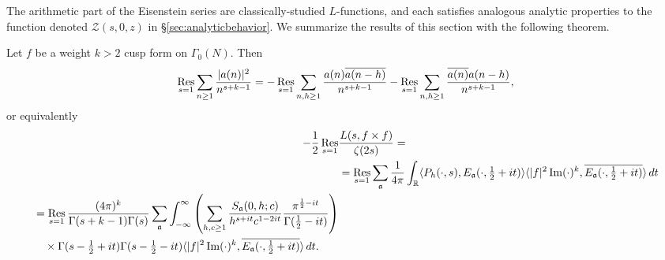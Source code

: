 The arithmetic part of the Eisenstein series are classically-studied $L$-functions, and
each satisfies analogous analytic properties to the function denoted $\mathcal{Z}(s,0,z)$
in \S\ref{sec:analyticbehavior}.
We summarize the results of this section with the following theorem.


\begin{theorem}\label{thm:general_weight_level_comparison}
  Let $f$ be a weight $k > 2$ cusp form on $\Gamma_0(N)$. Then
  \begin{align}\label{eq:general_level_general_comparison}
    \operatorname*{Res}_{s = 1} \sum_{n \geq 1} \frac{\lvert a(n) \rvert^2}{n^{s + k - 1}} = - \operatorname*{Res}_{s =
    1} \sum_{n,h \geq 1} \frac{a(n)\overline{a(n-h)}}{n^{s + k - 1}}- \operatorname*{Res}_{s = 1}
    \sum_{n,h \geq 1} \frac{\overline{a(n)} a(n-h)}{n^{s + k - 1}},
  \end{align}
  or equivalently
  \begin{align}\label{eq:general_level_kloosterman}
    -\frac{1}{2}\operatorname*{Res}_{s = 1} &\frac{L(s, f\times f)}{\zeta(2s)} =\\
    &= \operatorname*{Res}_{s = 1}\sum_{\mathfrak{a}} \frac{1}{4\pi} \int_\mathbb{R} \langle P_h(\cdot,
s), E_\mathfrak{a}(\cdot, \tfrac{1}{2} + it)\rangle \langle \lvert f \rvert^2
\operatorname{Im}(\cdot)^k, \overline{E_\mathfrak{a}(\cdot, \tfrac{1}{2} + it)}\rangle \, dt \\
    \begin{split}
      &= \operatorname*{Res}_{s = 1} \frac{(4\pi)^k}{\Gamma(s + k - 1)\Gamma(s)}\sum_{\mathfrak{a}}
      \int_{-\infty}^\infty  \left( \sum_{h,c \geq 1} \frac{S_\mathfrak{a} (0, h; c)}{h^{s
      + it} c^{1 - 2it}}\frac{\pi^{\frac{1}{2} - it}}{\Gamma(\frac{1}{2} - it)}\right) \\
      &\quad \times \Gamma(s - \tfrac{1}{2} + it)\Gamma(s - \tfrac{1}{2} - it) \langle
      \lvert f \rvert^2 \operatorname{Im}(\cdot)^k, \overline{E_\mathfrak{a}(\cdot, \tfrac{1}{2} + it)}
      \rangle \, dt.
    \end{split}
  \end{align}
\end{theorem}

